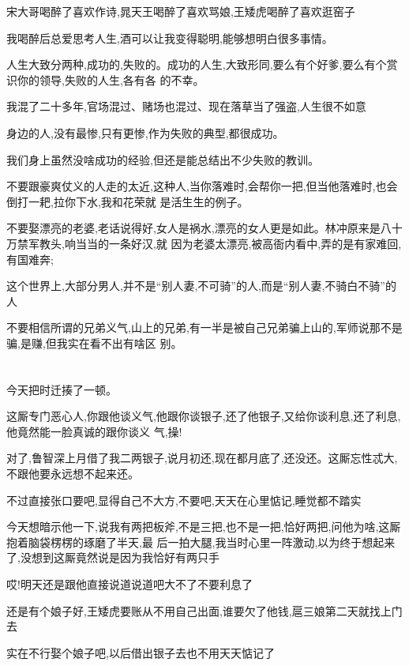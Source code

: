 ﻿\documentclass[12pt]{article}
\begin{document}
宋大哥喝醉了喜欢作诗,晁天王喝醉了喜欢骂娘,王矮虎喝醉了喜欢逛窑子\dldots

我喝醉后总爱思考人生,酒可以让我变得聪明,能够想明白很多事情。

人生大致分两种,成功的,失败的。成功的人生,大致形同,要么有个好爹,要么有个赏识你的领导,失败的人生,各有各
的不幸。

我混了二十多年,官场混过、赌场也混过、现在落草当了强盗,人生很不如意

身边的人,没有最惨,只有更惨,作为失败的典型,都很成功。

我们身上虽然没啥成功的经验,但还是能总结出不少失败的教训。

不要跟豪爽仗义的人走的太近,这种人,当你落难时,会帮你一把,但当他落难时,也会倒打一耙,拉你下水,我和花荣就
是活生生的例子。

不要娶漂亮的老婆,老话说得好,女人是祸水,漂亮的女人更是如此。林冲原来是八十万禁军教头,响当当的一条好汉,就
因为老婆太漂亮,被高衙内看中,弄的是有家难回,有国难奔;

这个世界上,大部分男人,并不是``别人妻,不可骑''的人,而是``别人妻,不骑白不骑''的人

不要相信所谓的兄弟义气,山上的兄弟,有一半是被自己兄弟骗上山的,军师说那不是骗,是赚,但我实在看不出有啥区
别。
\section{}

今天把时迁揍了一顿。

这厮专门恶心人,你跟他谈义气,他跟你谈银子,还了他银子,又给你谈利息,还了利息,他竟然能一脸真诚的跟你谈义
气,操!

对了,鲁智深上月借了我二两银子,说月初还,现在都月底了,还没还。这厮忘性忒大,不跟他要永远想不起来还。

不过直接张口要吧,显得自己不大方,不要吧,天天在心里惦记,睡觉都不踏实\dldots

今天想暗示他一下,说我有两把板斧,不是三把,也不是一把,恰好两把,问他为啥,这厮抱着脑袋楞楞的琢磨了半天,最
后一拍大腿,我当时心里一阵激动,以为终于想起来了,没想到这厮竟然说是因为我恰好有两只手\dldots

哎!明天还是跟他直接说道说道吧\dldots 大不了不要利息了\dldots

还是有个娘子好,王矮虎要账从不用自己出面,谁要欠了他钱,扈三娘第二天就找上门去\dldots

实在不行娶个娘子吧,以后借出银子去也不用天天惦记了\dldots

\section{}
\end{document}
